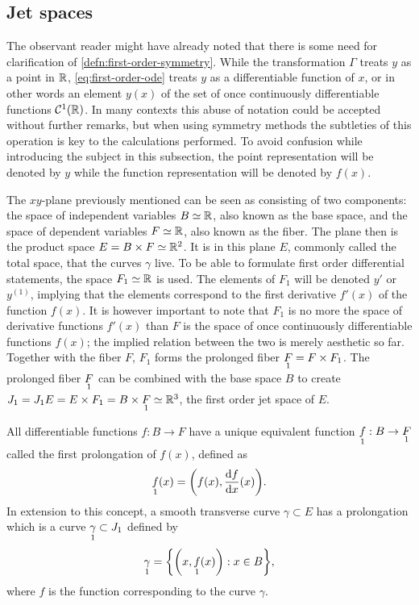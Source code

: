 \subsection{Jet spaces} \label{subsec:jet-spaces}

The observant reader might have already noted that there is some need for clarification of \cref{defn:first-order-symmetry}.
While the transformation \(\Gamma\) treats \(y\) as a point in \(\reals\), \cref{eq:first-order-ode} treats \(y\) as a differentiable function of \(x\), or in other words an element \(y(x)\) of the set of once continuously differentiable functions \(\mathcal{C}^1(\reals)\).
In many contexts this abuse of notation could be accepted without further remarks, but when using symmetry methods the subtleties of this operation is key to the calculations performed.
To avoid confusion while introducing the subject in this subsection, the point representation will be denoted by \(y\) while the function representation will be denoted by \(f(x)\).

The \(xy\)-plane previously mentioned can be seen as consisting of two components: the space of independent variables \(B \simeq \reals\), also known as the base space, and the space of dependent variables \(F \simeq \reals\), also known as the fiber.
The plane then is the product space \(E = B \times F \simeq \reals^2\).
It is in this plane \(E\), commonly called the total space, that the curves \(\gamma\) live.
To be able to formulate first order differential statements, the space \(F_1 \simeq \reals\) is used.
The elements of \(F_1\) will be denoted \(y'\) or \(y^{(1)}\), implying that the elements correspond to the first derivative \(f'(x)\) of the function \(f(x)\).
It is however important to note that \(F_1\) is no more the space of derivative functions \(f'(x)\) than \(F\) is the space of once continuously differentiable functions \(f(x)\); the implied relation between the two is merely aesthetic so far.
Together with the fiber \(F\), \(F_1\) forms the prolonged fiber \(\prolong{F}{1} = F \times F_1\).
The prolonged fiber \(\prolong{F}{1}\) can be combined with the base space \(B\) to create \(J_1 = J_1 E = E \times F_1 = B \times \prolong{F}{1} \simeq \reals^3\), the first order jet space of \(E\).

All differentiable functions \(f: B \to F\) have a unique equivalent function \(\prolong{f}{1}: B \to \prolong{F}{1}\) called the first prolongation of \(f(x)\), defined as
\begin{equation*}
  \prolong{f}{1}(x) = \left(f(x), \diff{f}{x}(x)\right).
\end{equation*}
In extension to this concept, a smooth transverse curve \(\gamma \subset E\) has a prolongation which is a curve \(\prolong{\gamma}{1} \subset J_1\) defined by
\begin{equation*}
  \prolong{\gamma}{1} = \left\{\left(x, \prolong{f}{1}(x)\right): x \in B\right\},
\end{equation*}
where \(f\) is the function corresponding to the curve \(\gamma\).

